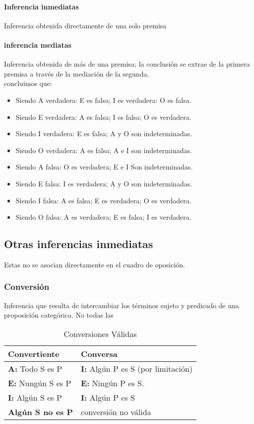 \documentclass[10pt]{book} 						%
\begin{document}
\paragraph{Inferencia inmediatas}
Inferencia obtenida directamente de una solo premisa
\paragraph{inferencia mediatas}
Inferencia obtenida de más de una premisa; la conclusión se extrae de la primera premisa a través de la mediación de la segunda.\\
concluimos que:\\
\begin{itemize}
\item Siendo A verdadera: E es falsa; I es verdadera: O es falsa.
\item Siendo E verdadera: A es falsa; I es falsa; O es verdadera.
\item Siendo I verdadera: E es falsa; A y O son indeterminadas.
\item Siendo O verdadera: A es falsa; A e I son indeterminadas.
\item Siendo A falsa: O es verdadera; E e I Son indeterminadas.
\item Siendo E falsa: I es verdadera; A y O son indeterminadas.
\item Siendo I falsa: A es falsa; E es verdadera; O es verdadera.
\item Siendo O falsa: A es verdadera; E es falsa; I es verdadera.
\end{itemize}

\subsection{Otras inferencias inmediatas}
Estas no se asocian directamente en el cuadro de oposición.
\subsubsection{Conversión}
Inferencia que resulta de intercambiar los términos sujeto y predicado de una proposición categórica. No todas las 
\begin{table}
\centering
\caption{Conversiones Válidas}
\begin{tabular}{l l}
Convertiente & Conversa\\
\hline
\textbf{A:} Todo S es P & \textbf{I:} Algún P es S (por limitación)\\
\textbf{E:} Nungún S es P & \textbf{E:} Ningún P es S.\\
\textbf{I:} Algún S es P & \textbf{I:} Algún P es S\\
\textbf{Algún S no es P} & conversión no válida \\
\end{tabular}
\end{table}
\end{document}
